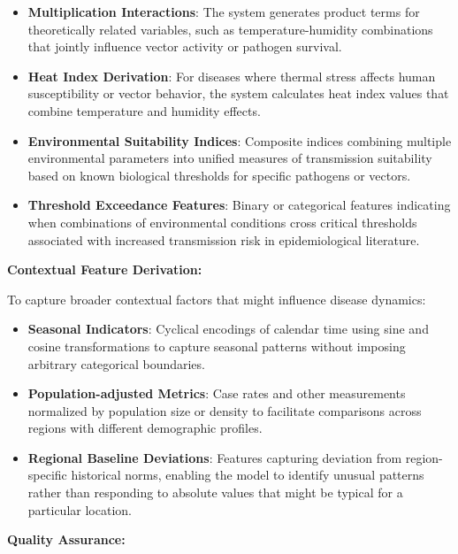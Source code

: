 \documentclass[12pt,a4paper]{report}
\begin{document}
\begin{itemize}
    \item \textbf{Multiplication Interactions}: The system generates product terms for theoretically related variables, such as temperature-humidity combinations that jointly influence vector activity or pathogen survival.
    
    \item \textbf{Heat Index Derivation}: For diseases where thermal stress affects human susceptibility or vector behavior, the system calculates heat index values that combine temperature and humidity effects.
    
    \item \textbf{Environmental Suitability Indices}: Composite indices combining multiple environmental parameters into unified measures of transmission suitability based on known biological thresholds for specific pathogens or vectors.
    
    \item \textbf{Threshold Exceedance Features}: Binary or categorical features indicating when combinations of environmental conditions cross critical thresholds associated with increased transmission risk in epidemiological literature.
\end{itemize}

\textbf{Contextual Feature Derivation:}

To capture broader contextual factors that might influence disease dynamics:

\begin{itemize}
    \item \textbf{Seasonal Indicators}: Cyclical encodings of calendar time using sine and cosine transformations to capture seasonal patterns without imposing arbitrary categorical boundaries.
    
    \item \textbf{Population-adjusted Metrics}: Case rates and other measurements normalized by population size or density to facilitate comparisons across regions with different demographic profiles.
    
    \item \textbf{Regional Baseline Deviations}: Features capturing deviation from region-specific historical norms, enabling the model to identify unusual patterns rather than responding to absolute values that might be typical for a particular location.
\end{itemize}

\textbf{Quality Assurance:}
\end{document}
